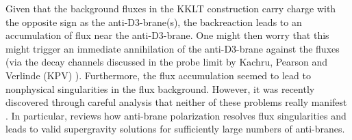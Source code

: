 \documentclass[11pt]{article}
\begin{document}
Given that the background fluxes in the KKLT construction carry charge with the opposite sign as the anti-D3-brane(s), the backreaction leads to an accumulation of flux near the anti-D3-brane. One might then worry that this might trigger an immediate annihilation of the anti-D3-brane against the fluxes (via the decay channels discussed in the probe limit by Kachru, Pearson and Verlinde (KPV) \cite{Kachru:2002gs}). Furthermore, the flux accumulation seemed to lead to nonphysical singularities in the flux background. However, it was recently discovered through careful analysis that neither of these problems really manifest \cite{Michel:2014lva, Gautason:2015tla, Cohen-Maldonado:2015ssa, Blaback:2019ucp}. In particular, \cite{Blaback:2019ucp} reviews how anti-brane polarization resolves flux singularities and leads to valid supergravity solutions for sufficiently large numbers of anti-branes.
\end{document}
